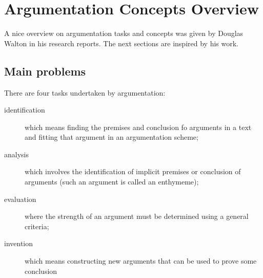 \documentclass[lnbip]{svmultln}
\begin{document}
\section{Argumentation Concepts Overview}
\par A nice overview on argumentation tasks and concepts was given by Douglas Walton in his research reports. The next sections are inspired by his work.
\subsection{Main problems}
\par
There are four tasks undertaken by argumentation:
\begin{description}
\item[identification] which means finding the premises and conclusion fo arguments in a text and fitting that argument in an argumentation scheme;
\item[analysis] which involves the identification of implicit premises or conclusion of arguments (such an argument is called an enthymeme);
\item[evaluation] where the strength of an argument must be determined using a general criteria;
\item[invention] which means constructing new arguments that can be used to prove some conclusion
\end{description}
\end{document}
